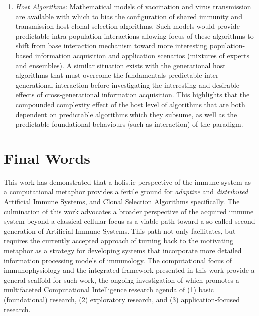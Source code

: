\begin{enumerate}
	\item \emph{Host Algorithms}: Mathematical models of vaccination and virus transmission are available with which to bias the configuration of shared immunity and transmission host clonal selection algorithms. Such models would provide predictable intra-population interactions allowing focus of these algorithms to shift from base interaction mechanism toward more interesting population-based information acquisition and application scenarios (mixtures of experts and ensembles). A similar situation exists with the generational host algorithms that must overcome the fundamentals predictable inter-generational interaction before investigating the interesting and desirable effects of cross-generational information acquisition. This highlights that the compounded complexity effect of the host level of algorithms that are both dependent on predictable algorithms which they subsume, as well as the predictable foundational behaviours (such as interaction) of the paradigm. 
\end{enumerate}

%
% 
\section{Final Words}
\label{sec:conclusions:finalwords}
This work has demonstrated that a holistic perspective of the immune system as a computational metaphor provides a fertile ground for \emph{adaptive} and \emph{distributed} Artificial Immune Systems, and Clonal Selection Algorithms specifically.
The culmination of this work advocates a broader perspective of the acquired immune system beyond a classical cellular focus as a viable path toward a so-called second generation of Artificial Immune Systems. This path not only facilitates, but requires the currently accepted approach of turning back to the motivating metaphor as a strategy for developing systems that incorporate more detailed information processing models of immunology. 
The computational focus of immunophysiology and the integrated framework presented in this work provide a general scaffold for such work, the ongoing investigation of which promotes a multifaceted Computational Intelligence research agenda of (1) basic (foundational) research, (2) exploratory research, and (3) application-focused research.

